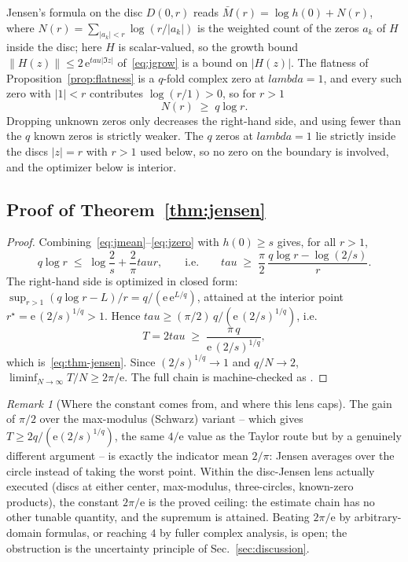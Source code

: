 \documentclass[%
  aps,
  pra,
  preprint,
  superscriptaddress,
  amsmath,amssymb,
  nofootinbib,
  floatfix,
]{revtex4-2}
\def\lambda{lambda}\def\tau{tau}\def\phi{phi}\def\alpha{alpha}%
\theoremstyle{definition}
\theoremstyle{remark}
\newtheorem{remark}[theorem]{Remark}
\newcommand{\tauvar}{\tau}
\DeclareRobustCommand{\lean}[1]{\path{#1}}
\begin{document}
Jensen's formula on the disc $D(0,r)$ reads
$\bar M(r)=\log h(0)+N(r)$, where $N(r)=\sum_{|a_k|<r}\log(r/|a_k|)$ is the weighted count of
the zeros $a_k$ of $H$ inside the disc; here $H$ is scalar-valued, so the growth bound
$\|H(z)\|\le2\,\mathrm{e}^{\tauvar|\Im z|}$ of~\eqref{eq:jgrow} is a bound on $|H(z)|$. The flatness of
Proposition~\ref{prop:flatness} is a $q$-fold complex zero at $\lambda=1$,
and every such zero with $|1|<r$ contributes $\log(r/1)>0$, so for $r>1$
\begin{equation}
N(r)\;\ge\;q\log r.
\label{eq:jzero}
\end{equation}
Dropping unknown zeros only decreases the right-hand side, and using fewer than the $q$
known zeros is strictly weaker. The $q$ zeros at $\lambda=1$ lie strictly inside the discs $|z|=r$ with $r>1$ used below, so no
zero on the boundary is involved, and the optimizer below is interior.

\subsection{Proof of Theorem~\ref{thm:jensen}}

\begin{proof}
Combining~\eqref{eq:jmean}--\eqref{eq:jzero} with $h(0)\ge s$ gives, for all $r>1$,
\begin{equation}
q\log r\;\le\;\log\frac{2}{s}+\frac{2}{\pi}\tauvar r,
\qquad\text{i.e.}\qquad
\tauvar\;\ge\;\frac{\pi}{2}\,\frac{q\log r-\log(2/s)}{r}.
\label{eq:jcombine}
\end{equation}
The right-hand side is optimized in closed form:
$\sup_{r>1}(q\log r-L)/r=q/(\mathrm{e}\,\mathrm{e}^{L/q})$, attained at the interior point
$r^\star=\mathrm{e}\,(2/s)^{1/q}>1$. Hence
$\tauvar\ge(\pi/2)\,q/(\mathrm{e}\,(2/s)^{1/q})$, i.e.
\begin{equation}
T=2\tauvar\;\ge\;\frac{\pi\,q}{\mathrm{e}\,(2/s)^{1/q}},
\end{equation}
which is~\eqref{eq:thm-jensen}. Since $(2/s)^{1/q}\to1$ and $q/N\to2$,
$\liminf_{N\to\infty}T/N\ge2\pi/\mathrm{e}$. The full chain is machine-checked as
\lean{jensen_rung_final}.
\end{proof}

\begin{remark}[Where the constant comes from, and where this lens caps]
The gain of $\pi/2$ over the max-modulus (Schwarz) variant -- which gives
$T\ge2q/(\mathrm{e}(2/s)^{1/q})$, the same $4/\mathrm{e}$ value as the Taylor route but by a genuinely
different argument -- is exactly the indicator mean $2/\pi$: Jensen averages over the
circle instead of taking the worst point. Within the disc-Jensen lens actually executed
(discs at either center, max-modulus, three-circles, known-zero products), the constant
$2\pi/\mathrm{e}$ is the proved ceiling: the estimate chain has no other tunable quantity, and the
supremum is attained. Beating $2\pi/\mathrm{e}$ by arbitrary-domain formulas, or reaching $4$ by
fuller complex analysis, is open; the obstruction is the uncertainty principle of
Sec.~\ref{sec:discussion}.
\end{remark}
\end{document}
